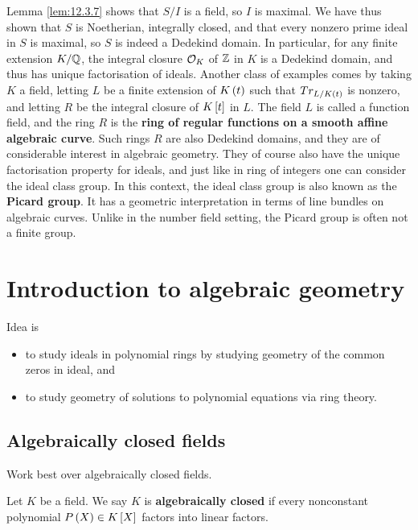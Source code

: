 Lemma \ref{lem:12.3.7} shows that $ S / I $ is a field, so $ I $ is maximal. We have thus shown that $ S $ is Noetherian, integrally closed, and that every nonzero prime ideal in $ S $ is maximal, so $ S $ is indeed a Dedekind domain. In particular, for any finite extension $ K / \Q $, the integral closure $ \OO_K $ of $ \Z $ in $ K $ is a Dedekind domain, and thus has unique factorisation of ideals. Another class of examples comes by taking $ K $ a field, letting $ L $ be a finite extension of $ K\rb{t} $ such that $ Tr_{L / K\rb{t}} $ is nonzero, and letting $ R $ be the integral closure of $ K\sb{t} $ in $ L $. The field $ L $ is called a function field, and the ring $ R $ is the \textbf{ring of regular functions on a smooth affine algebraic curve}. Such rings $ R $ are also Dedekind domains, and they are of considerable interest in algebraic geometry. They of course also have the unique factorisation property for ideals, and just like in ring of integers one can consider the ideal class group. In this context, the ideal class group is also known as the \textbf{Picard group}. It has a geometric interpretation in terms of line bundles on algebraic curves. Unlike in the number field setting, the Picard group is often not a finite group.

\pagebreak

\section{Introduction to algebraic geometry}


Idea is
\begin{itemize}
\item to study ideals in polynomial rings by studying geometry of the common zeros in ideal, and
\item to study geometry of solutions to polynomial equations via ring theory.
\end{itemize}

\subsection{Algebraically closed fields}

Work best over algebraically closed fields.

\begin{definition}
Let $ K $ be a field. We say $ K $ is \textbf{algebraically closed} if every nonconstant polynomial $ P\rb{X} \in K\sb{X} $ factors into linear factors.
\end{definition}

